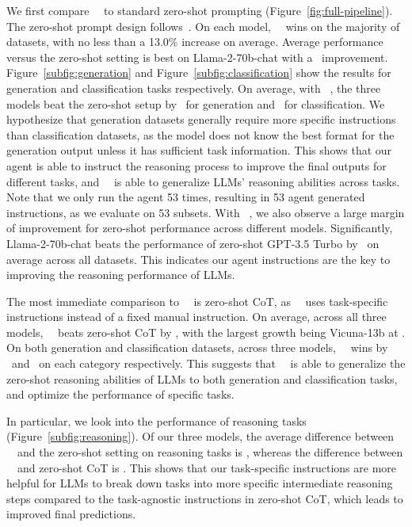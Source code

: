 We first compare \zeroshotmid\ \method\ to standard zero-shot prompting (Figure~\ref{fig:full-pipeline}). The zero-shot prompt design follows~\citet{liang2022holistic}. On each model, \zeroshotmid\ \method\ wins on the majority of datasets, with no less than a 13.0\% increase on average. Average performance versus the zero-shot setting is best on Llama-2-70b-chat with a \LlamaTwoSeventyChatAvgwinOverZs\ improvement. Figure~\ref{subfig:generation} and Figure~\ref{subfig:classification} show the results for generation and classification tasks respectively. On average, with \zeroshotmid\ \method, the three models beat the zero-shot setup by \ThreemodelsGenerationAvgwinOverZs\ for generation and \ThreemodelsClassificationAvgwinOverZs\ for classification. We hypothesize that generation datasets generally require more specific instructions than classification datasets, as the model does not know the best format for the generation output unless it has sufficient task information. This shows that our agent is able to instruct the reasoning process to improve the final outputs for different tasks, and \zeroshotmid\ \method\ is able to generalize LLMs' reasoning abilities across tasks. Note that we only run the agent 53 times, resulting in 53 agent generated instructions, as we evaluate on 53 subsets. With \zeroshotmid\ \method, we also observe a large margin of improvement for zero-shot performance across different models. Significantly, Llama-2-70b-chat beats the performance of zero-shot GPT-3.5 Turbo by \LlamaTwoSeventyChatAvgwinOverChatgptZs\ on average across all datasets. This indicates our agent instructions are the key to improving the reasoning performance of LLMs.

The most immediate comparison to \zeroshotmid\ \method\ is zero-shot CoT, as \zeroshotmid\ \method\ uses task-specific instructions instead of a fixed manual instruction. On average, across all three models, \zeroshotmid\ \method\ beats zero-shot CoT by \ThreemodelsOverallAvgwinOverZscot, with the largest growth being Vicuna-13b at \VicunaThirteenAvgwinOverZscot. On both generation and classification datasets, across three models, \zeroshotmid\ \method\ wins by \ThreemodelsGenerationAvgwinOverZscot\ and \ThreemodelsClassificationAvgwinOverZscot\ on each category respectively. This suggests that \zeroshotmid\ \method\ is able to generalize the zero-shot reasoning abilities of LLMs to both generation and classification tasks, and optimize the performance of specific tasks.

In particular, we look into the performance of reasoning tasks (Figure~\ref{subfig:reasoning}). Of our three models, the average difference between \zeroshotmid\ \method\ and the zero-shot setting on reasoning tasks is \ThreemodelsReasoningAvgwinOverZs, whereas the difference between \zeroshotmid\ \method\ and zero-shot CoT is \ThreemodelsReasoningAvgwinOverZscot. This shows that our task-specific instructions are more helpful for LLMs to break down tasks into more specific intermediate reasoning steps compared to the task-agnostic instructions in zero-shot CoT, which leads to improved final predictions.

